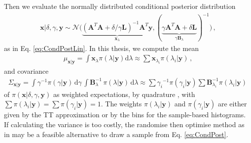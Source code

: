 Then we evaluate the normally distributed conditional posterior distribution
\begin{align}
	\bm{x}| \delta, \gamma, \bm{y}  \sim \mathcal{N}\big( \underbrace{ (\bm{A}^T \bm{A} + \delta / \gamma \bm{L} )^{-1} \bm{A}^T \bm{y}}_{\bm{x}_{\lambda}}, ( \underbrace{ \gamma \bm{A}^T \bm{A} + \delta \bm{L} }_{\gamma \bm{B}_{\lambda}}  )^{-1} \big) \, \label{eq:CondPost},
\end{align}
as in Eq. \ref{eq:CondPostLin}.
In this thesis, we compute the mean
\begin{align}
	\mu_{\bm{x}|\bm{y}} = \int \bm{x}_{\lambda} \pi(\lambda| \bm{y}) \text{d}\lambda \approx \sum \bm{x}_{\lambda_i} \pi(\lambda_i| \bm{y}) \, , \label{eq:MeanInt}
\end{align} and covariance
\begin{align}
	\Sigma_{\bm{x}|\bm{y}} = \int \gamma^{-1}  \pi(\gamma | \bm{y} ) \, \text{d} \gamma \, \int  \bm{B}_{\lambda}^{-1} \, \pi(\lambda | \bm{y} )  \, \text{d} \lambda  \approx \sum {\gamma_i}^{-1}\pi(\gamma_i| \bm{y}) \sum \bm{B}_{\lambda_i}^{-1}\pi(\lambda_i| \bm{y})\, \label{eq:CovInt}
\end{align}
of $\pi(\bm{x}| \delta, \gamma, \bm{y})$ as weighted expectations, by quadrature \cite[Sec. 2.1]{Dick_Kuo_Sloan_2013}, with $\sum \pi(\lambda_i| \bm{y}) = \sum \pi(\gamma_i| \bm{y}) = 1$.
The weights $\pi(\lambda_i| \bm{y})$ and $\pi(\gamma_i| \bm{y})$ are either given by the TT approximation or by the bins for the sample-based histograms.
If calculating the variance is too costly, the randomise then optimise method as in \cite{bardsley2015randomize, fox2016fast} may be a feasible alternative to draw a sample from Eq. \ref{eq:CondPost}.



%



